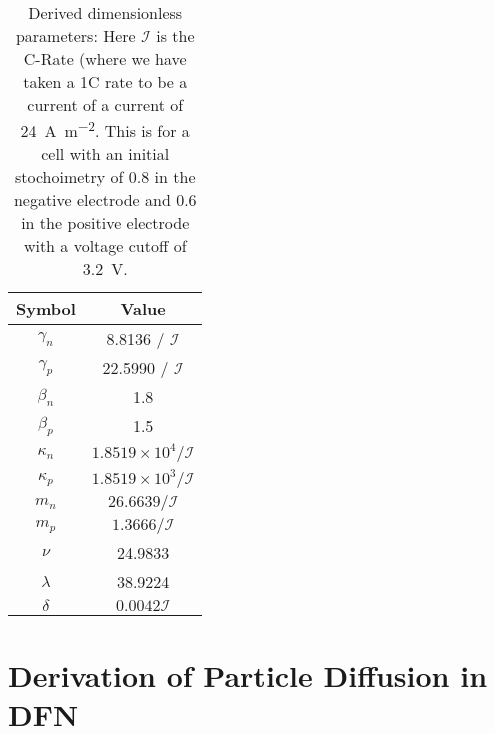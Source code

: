 \documentclass[preprint]{elsarticle}
\begin{document}
\begin{table}[h]
	\centering
	\begin{tabular}{|c|c|}\hline
    	Symbol & Value \\ \hline
        $\gamma_n$ & 8.8136 / $\mathcal{I}$ \\ 
        $\gamma_p$ & 22.5990 / $\mathcal{I}$ \\ 
        $\beta_n$ & 1.8 \\
        $\beta_p$ & 1.5 \\ 
        $\kappa_n$ & $1.8519\times10^4/ \mathcal{I}$  \\ 
        $\kappa_p$ & $1.8519\times10^3/ \mathcal{I}$\\ 
        $m_n$ & $26.6639/ \mathcal{I}$ \\ 
        $m_p$ & $1.3666/ \mathcal{I}$ \\ 
        $\nu$ & 24.9833 \\
        $\lambda$ & 38.9224 \\ 
        $\delta$ & $0.0042 \mathcal{I}$ \\ \hline
    \end{tabular}
    \caption{Derived dimensionless parameters: Here $\mathcal{I}$ is the C-Rate (where we have taken a 1C rate to be a current of a current of \SI{24}{\ampere \metre^{-2}}. This is for a cell with an initial stochoimetry of $0.8$ in the negative electrode and $0.6$ in the positive electrode with a voltage cutoff of \SI{3.2}{\volt}.}\label{tab:nonDim}
\end{table} 


\section{Derivation of Particle Diffusion in DFN}


\end{document}
